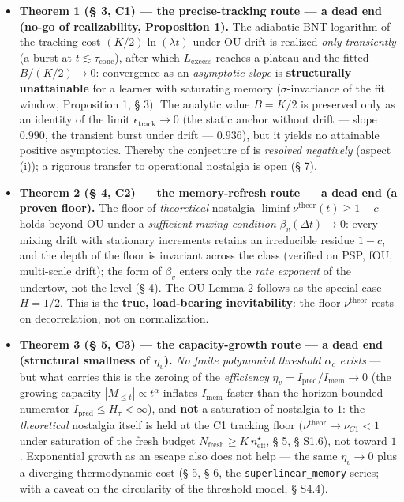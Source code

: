 \documentclass[12pt]{iopart}
\providecommand{\tightlist}{\setlength{\itemsep}{0pt}\setlength{\parskip}{0pt}}
\begin{document}
\begin{itemize}

\tightlist

\item

  \textbf{Theorem 1 (§ 3, C1) --- the precise-tracking route --- a dead end (no-go of realizability, Proposition 1).} The adiabatic BNT logarithm of the tracking cost \((K/2)\ln(\lambda t)\) under OU drift is realized \emph{only transiently} (a burst at \(t \lesssim \tau_{\text{conc}}\)), after which \(L_{\text{excess}}\) reaches a plateau and the fitted \(B/(K/2) \to 0\): convergence as an \emph{asymptotic slope} is \textbf{structurally unattainable} for a learner with saturating memory (\(\sigma\)-invariance of the fit window, Proposition 1, § 3). The analytic value \(B = K/2\) is preserved only as an identity of the limit \(\epsilon_{\text{track}} \to 0\) (the static anchor without drift --- slope \(0.990\), the transient burst under drift --- \(0.936\)), but it yields no attainable positive asymptotics. Thereby the conjecture of \cite{Andriishin2026b} is \emph{resolved negatively} (aspect (i)); a rigorous transfer to operational nostalgia is open (§ 7).

\item

  \textbf{Theorem 2 (§ 4, C2) --- the memory-refresh route --- a dead end (a proven floor).} The floor of \emph{theoretical} nostalgia \(\liminf \nu^{\text{theor}}(t) \ge 1 - c\) holds beyond OU under a \emph{sufficient mixing condition} \(\beta_v(\Delta t) \to 0\): every mixing drift with stationary increments retains an irreducible residue \(1 - c\), and the depth of the floor is invariant across the class (verified on PSP, fOU, multi-scale drift); the form of \(\beta_v\) enters only the \emph{rate exponent} of the undertow, not the level (§ 4). The OU Lemma 2 \cite{Andriishin2026b} follows as the special case \(H = 1/2\). This is the \textbf{true, load-bearing inevitability}: the floor \(\nu^{\text{theor}}\) rests on decorrelation, not on normalization.

\item

  \textbf{Theorem 3 (§ 5, C3) --- the capacity-growth route --- a dead end (structural smallness of \(\eta_v\)).} \emph{No finite polynomial threshold \(\alpha_c\) exists} --- but what carries this is the zeroing of the \emph{efficiency} \(\eta_v = I_{\text{pred}}/I_{\text{mem}} \to 0\) (the growing capacity \(|M_{\le t}| \propto t^\alpha\) inflates \(I_{\text{mem}}\) faster than the horizon-bounded numerator \(I_{\text{pred}} \le H_\tau < \infty\)), and \textbf{not} a saturation of nostalgia to \(1\): the \emph{theoretical} nostalgia itself is held at the C1 tracking floor (\(\nu^{\text{theor}} \to \nu_{C1} < 1\) under saturation of the fresh budget \(N_{\text{fresh}} \ge K\,n_{\text{eff}}^\star\), § 5, § S1.6), not toward \(1\). Exponential growth as an escape also does not help --- the same \(\eta_v \to 0\) plus a diverging thermodynamic cost (§ 5, § 6, the \texttt{superlinear\_memory} series; with a caveat on the circularity of the threshold model, § S4.4).

\end{itemize}
\end{document}
